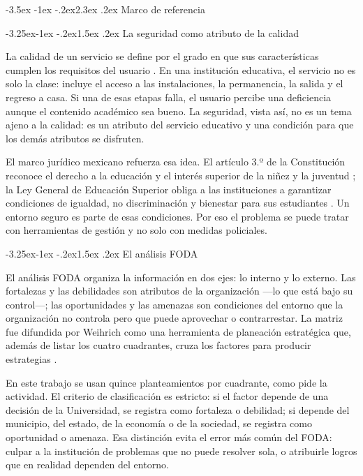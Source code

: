 \documentclass[11pt,a4paper]{article}
\makeatletter
\renewcommand\section{\@startsection{section}{1}{\z@}%
  {-3.5ex \@plus -1ex \@minus -.2ex}{2.3ex \@plus .2ex}%
  {\normalfont\Large\bfseries\color{uazblue}}}
\renewcommand\subsection{\@startsection{subsection}{2}{\z@}%
  {-3.25ex\@plus -1ex \@minus -.2ex}{1.5ex \@plus .2ex}%
  {\normalfont\large\bfseries\color{uazblue!85!black}}}
\makeatother
\begin{document}
\section{Marco de referencia}

\subsection{La seguridad como atributo de la calidad}

La calidad de un servicio se define por el grado en que sus características
cumplen los requisitos del usuario \cite{juran2015}. En una institución
educativa, el servicio no es solo la clase: incluye el acceso a las
instalaciones, la permanencia, la salida y el regreso a casa. Si una de esas
etapas falla, el usuario percibe una deficiencia aunque el contenido académico
sea bueno. La seguridad, vista así, no es un tema ajeno a la calidad: es un
atributo del servicio educativo y una condición para que los demás atributos se
disfruten.

El marco jurídico mexicano refuerza esa idea. El artículo 3.º de la
Constitución reconoce el derecho a la educación y el interés superior de la
niñez y la juventud \cite{cpeum}; la Ley General de Educación Superior obliga a
las instituciones a garantizar condiciones de igualdad, no discriminación y
bienestar para sus estudiantes \cite{lges2021}. Un entorno seguro es parte de
esas condiciones. Por eso el problema se puede tratar con herramientas de
gestión y no solo con medidas policiales.

\subsection{El análisis FODA}

El análisis FODA organiza la información en dos ejes: lo interno y lo externo.
Las fortalezas y las debilidades son atributos de la organización ---lo que
está bajo su control---; las oportunidades y las amenazas son condiciones del
entorno que la organización no controla pero que puede aprovechar o
contrarrestar. La matriz fue difundida por Weihrich como una herramienta de
planeación estratégica que, además de listar los cuatro cuadrantes, cruza los
factores para producir estrategias \cite{weihrich1982}.

En este trabajo se usan quince planteamientos por cuadrante, como pide la
actividad. El criterio de clasificación es estricto: si el factor depende de una
decisión de la Universidad, se registra como fortaleza o debilidad; si depende
del municipio, del estado, de la economía o de la sociedad, se registra como
oportunidad o amenaza. Esa distinción evita el error más común del FODA: culpar
a la institución de problemas que no puede resolver sola, o atribuirle logros
que en realidad dependen del entorno.
\end{document}
